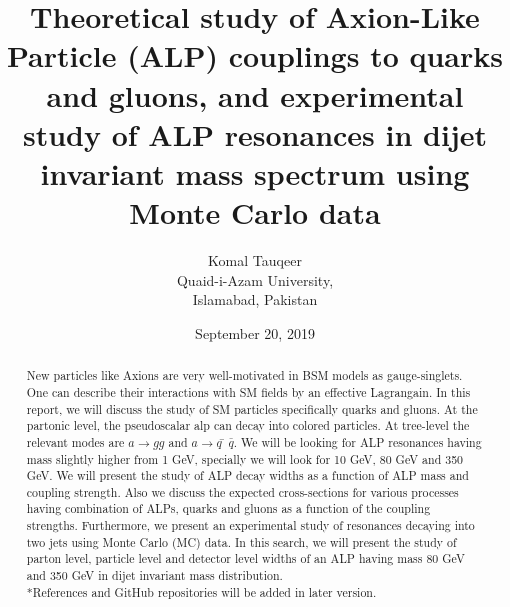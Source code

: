 \documentclass[12pt,a4paper]{article}
\begin{document}
\title{Theoretical study of Axion-Like Particle (ALP) couplings to quarks and gluons, and experimental study of ALP resonances in dijet invariant mass spectrum using Monte Carlo data}
\author{Komal Tauqeer \\ Quaid-i-Azam University, \\Islamabad, Pakistan}
\date{September 20, 2019}

\maketitle

\begin{abstract}

New particles like Axions are very well-motivated in BSM models as gauge-singlets. One can describe their interactions with SM fields by an effective Lagrangain. In this report, we will discuss the study of SM particles specifically quarks and gluons. At the partonic level, the pseudoscalar alp can decay into colored particles. At tree-level the relevant modes are $a \rightarrow g g$ and $a \rightarrow q ̄\bar q$. We will be looking for ALP resonances having mass slightly higher from 1 GeV, specially we will look for 10 GeV, 80 GeV and 350 GeV. We will present the study of ALP decay widths as a function of ALP mass and coupling strength. Also we discuss the expected cross-sections for various processes having combination of ALPs, quarks and gluons as a function of the coupling strengths. Furthermore, we present an experimental study of resonances decaying into two jets using Monte Carlo (MC) data. In this search, we will present the study of parton level, particle level and detector level widths of an ALP having mass 80 GeV and 350 GeV in dijet invariant mass distribution. \\

*References and GitHub repositories will be added in later version. 

\end{abstract}
\pagebreak
\end{document}
